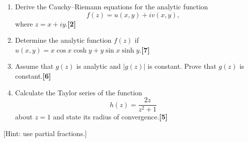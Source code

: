 \documentclass[a4paper]{article}
\begin{document}
\newpage
\begin{qns}
\leavevmode
\begin{enumerate}[label=(\alph*)]
\item Derive the Cauchy–Riemann equations for the analytic function
$$f(z)=u(x,y)+iv(x,y),$$
where $z = x + iy$.\hfill \textbf{[2]}
\item Determine the analytic function $f(z)$ if $u(x, y) = x\cos x \cosh y + y \sin x \sinh y$.\hfill \textbf{[7]}
\item Assume that $g(z)$ is analytic and $|g(z)|$ is constant. Prove that $g(z)$ is constant.\hfill \textbf{[6]}
\item Calculate the Taylor series of the function
$$h(z)=\frac{2z}{z^2+1}$$
about $z = 1$ and state its radius of convergence.\hfill \textbf{[5]}
\end{enumerate}
[Hint: use partial fractions.]
\end{qns}
\end{document}
